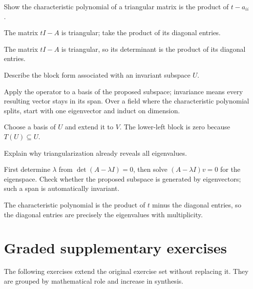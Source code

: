 \begin{exercise}\label{exr:i10-06}
Show the characteristic polynomial of a triangular matrix is the product of $t-a_{ii}$.
\end{exercise}
\begin{hint}
The matrix \(tI-A\) is triangular; take the product of its diagonal entries.
\end{hint}
\begin{solution}
The matrix $tI-A$ is triangular, so its determinant is the product of its diagonal entries.
\end{solution}

\begin{exercise}\label{exr:i10-07}
Describe the block form associated with an invariant subspace $U$.
\end{exercise}
\begin{hint}
Apply the operator to a basis of the proposed subspace; invariance means every resulting vector stays in its span. Over a field where the characteristic polynomial splits, start with one eigenvector and induct on dimension.
\end{hint}
\begin{solution}
Choose a basis of $U$ and extend it to $V$. The lower-left block is zero because $T(U)\subseteq U$.
\end{solution}

\begin{exercise}\label{exr:i10-08}
Explain why triangularization already reveals all eigenvalues.
\end{exercise}
\begin{hint}
First determine \(\lambda\) from \(\det(A-\lambda I)=0\), then solve \((A-\lambda I)v=0\) for the eigenspace. Check whether the proposed subspace is generated by eigenvectors; such a span is automatically invariant.
\end{hint}
\begin{solution}
The characteristic polynomial is the product of $t$ minus the diagonal entries, so the diagonal entries are precisely the eigenvalues with multiplicity.
\end{solution}


\section{Graded supplementary exercises}
The following exercises extend the original exercise set without replacing it. They are grouped by mathematical role and increase in synthesis.

